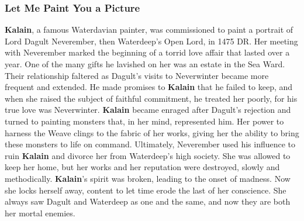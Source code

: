 \documentclass[10pt,a4paper,twoside,twocolumn,openany,nodeprecatedcode]{dndbook}
\begin{document}
\subsubsection{Let Me Paint You a Picture}
\textbf{Kalain}, a famous Waterdavian painter, was commissioned to paint a portrait of Lord Dagult Neverember, then Waterdeep's Open Lord, in 1475 DR. Her meeting with Neverember marked the beginning of a torrid love affair that lasted over a year. One of the many gifts he lavished on her was an estate in the Sea Ward.
Their relationship faltered as Dagult's visits to Neverwinter became more frequent and extended. He made promises to \textbf{Kalain} that he failed to keep, and when she raised the subject of faithful commitment, he treated her poorly, for his true love was Neverwinter. \textbf{Kalain} became enraged after Dagult's rejection and turned to painting monsters that, in her mind, represented him. Her power to harness the Weave clings to the fabric of her works, giving her the ability to bring these monsters to life on command.
Ultimately, Neverember used his influence to ruin \textbf{Kalain} and divorce her from Waterdeep's high society. She was allowed to keep her home, but her works and her reputation were destroyed, slowly and methodically. \textbf{Kalain}'s spirit was broken, leading to the onset of madness. Now she locks herself away, content to let time erode the last of her conscience. She always saw Dagult and Waterdeep as one and the same, and now they are both her mortal enemies.
\end{document}
